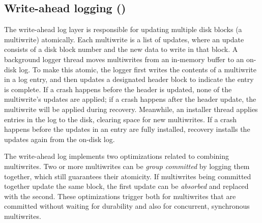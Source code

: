 


\subsection[Write-ahead logging (WAL)]{Write-ahead logging ()}


The write-ahead log layer is responsible for updating multiple disk
blocks (a multiwrite) atomically.
Each multiwrite is a list
of updates, where an update consists of a disk block number and the new data to write in that block.
A background logger thread moves multiwrites from an in-memory buffer to an
on-disk log. To make this atomic, the logger first writes
the contents of a multiwrite in a log entry, and then updates a designated header block to indicate
the entry is complete. If a crash
happens before the header is updated, none of the multiwrite's updates
are applied; if a crash happens after the header update, the multiwrite
will be applied during recovery.
Meanwhile, an installer thread applies entries in the log to the disk, clearing
space for new multiwrites.
If a crash happens before the updates in an entry are fully installed,
recovery installs the updates again from the on-disk log.

The write-ahead log implements two optimizations related to combining
multiwrites. Two or more multiwrites can be \emph{group committed} by logging
them together, which still guarantees their atomicity. If multiwrites being
committed together update the same block, the first update can be
\emph{absorbed} and replaced with the second. These optimizations trigger both
for multiwrites that are committed without waiting for durability and also for
concurrent, synchronous multiwrites.

%

